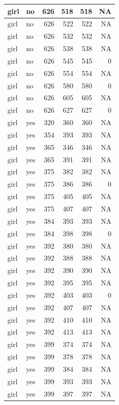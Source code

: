 \documentclass[man]{apa6}
\begin{document}
\begin{tabular}{l|l|r|r|r|r}
\hline
girl & no & 626 & 518 & 518 & NA\\
\hline
girl & no & 626 & 522 & 522 & NA\\
\hline
girl & no & 626 & 532 & 532 & NA\\
\hline
girl & no & 626 & 538 & 538 & NA\\
\hline
girl & no & 626 & 545 & 545 & 0\\
\hline
girl & no & 626 & 554 & 554 & NA\\
\hline
girl & no & 626 & 580 & 580 & 0\\
\hline
girl & no & 626 & 605 & 605 & NA\\
\hline
girl & no & 626 & 627 & 627 & 0\\
\hline
girl & yes & 320 & 360 & 360 & NA\\
\hline
girl & yes & 354 & 393 & 393 & NA\\
\hline
girl & yes & 365 & 346 & 346 & NA\\
\hline
girl & yes & 365 & 391 & 391 & NA\\
\hline
girl & yes & 375 & 382 & 382 & NA\\
\hline
girl & yes & 375 & 386 & 386 & 0\\
\hline
girl & yes & 375 & 405 & 405 & NA\\
\hline
girl & yes & 375 & 407 & 407 & NA\\
\hline
girl & yes & 384 & 393 & 393 & NA\\
\hline
girl & yes & 384 & 398 & 398 & 0\\
\hline
girl & yes & 392 & 380 & 380 & NA\\
\hline
girl & yes & 392 & 388 & 388 & NA\\
\hline
girl & yes & 392 & 390 & 390 & NA\\
\hline
girl & yes & 392 & 395 & 395 & NA\\
\hline
girl & yes & 392 & 403 & 403 & 0\\
\hline
girl & yes & 392 & 407 & 407 & NA\\
\hline
girl & yes & 392 & 410 & 410 & NA\\
\hline
girl & yes & 392 & 413 & 413 & NA\\
\hline
girl & yes & 399 & 374 & 374 & NA\\
\hline
girl & yes & 399 & 378 & 378 & NA\\
\hline
girl & yes & 399 & 384 & 384 & NA\\
\hline
girl & yes & 399 & 393 & 393 & NA\\
\hline
girl & yes & 399 & 397 & 397 & NA\\

\end{tabular}
\end{document}
